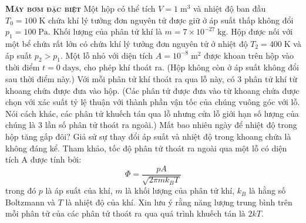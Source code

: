 \begin{problem}{\textbf{\textsc{Máy bơm đặc biệt}}} Một hộp có thể tích $V=1\;\mathrm{m}^3$ và nhiệt độ ban đầu $T_0=100\;\mathrm{K}$ chứa khí lý tưởng đơn nguyên tử được giữ ở áp suất thấp không đổi $p_1=100\;\mathrm{Pa}$. Khối lượng của phân tử khí là $m=7\times10^{-27}\;\mathrm{kg}$. Hộp được nối với một bể chứa rất lớn có chứa khí lý tưởng đơn nguyên tử ở nhiệt độ $T_2=400\;\mathrm{K}$ và áp suất $p_2>p_1$. Một lỗ nhỏ với diện tích $A=10^{-8}\;\mathrm{m}^2$ được khoan trên hộp vào thời điểm $t=0\;\mathrm{days}$, cho phép khí thoát ra. (Hộp không còn ở áp suất không đổi sau thời điểm này.) Với mỗi phân tử khí thoát ra qua lỗ này, có 3 phân tử khí từ khoang chứa được đưa vào hộp. (Các phân tử được đưa vào từ khoang chứa được chọn với xác suất tỷ lệ thuận với thành phần vận tốc của chúng vuông góc với lỗ. Nói cách khác, các phân tử khuếch tán qua lỗ nhưng cửa lỗ giới hạn số lượng của chúng là 3 lần số phân tử thoát ra ngoài.) Mất bao nhiêu ngày để nhiệt độ trong hộp tăng gấp đôi? Giả sử sự thay đổi áp suất và nhiệt độ trong khoang chứa là không đáng kể. Tham khảo, tốc độ phân tử thoát ra ngoài qua một lỗ có diện tích A được tính bởi:\begin{equation*}
    \Phi=\frac{pA}{\sqrt{2\pi mk_BT}}
\end{equation*}
trong đó $p$ là áp suất của khí, $m$ là khối lượng của phân tử khí, $k_B$ là hằng số Boltzmann và $T$ là nhiệt độ của khí. Xin lưu ý rằng năng lượng trung bình trên mỗi phân tử của các phân tử thoát ra qua quá trình khuếch tán là $2kT$.

\end{problem}

